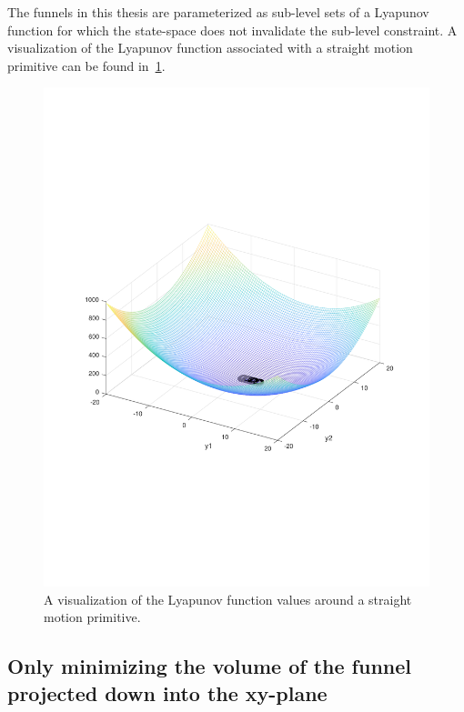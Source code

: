 The funnels in this thesis are parameterized as sub-level sets of a Lyapunov
function for which the state-space does not invalidate the sub-level constraint.
A visualization of the Lyapunov function associated with a straight motion
primitive can be found in~\cref{fig:visualized-lyapunov}.
\begin{figure}
  \centering \includegraphics[trim={3cm 7cm 3cm 7cm},
  scale=.6]{figures/rrtfunnel/straight-funnel-lyapunov-3d}
  \caption{A visualization of the Lyapunov function values around a straight
    motion primitive.}
  \label{fig:visualized-lyapunov}
\end{figure}

\subsection{Only minimizing the volume of the funnel projected down into the
  xy-plane}
\label{subsec:xy-cost-function}

